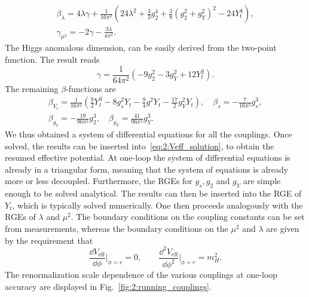 \begin{equation}
\begin{gathered}
\beta_\lambda = 4 \lambda \gamma + \frac{1}{16 \pi^2} (24 \lambda^2 + \frac{3}{2} g_2^4 + \frac{3}{8} (g_2^2 + g_Y^2)^2 - 24 Y_t^4), \\
\gamma_{\mu^2} = - 2 \gamma - \frac{3 \lambda}{4 \pi^2}.
\end{gathered}
\label{eq:2:beta_lambda_and_gamma_mu2}
\end{equation}
The Higgs anomalous dimension, can be easily derived from the two-point function. The result reads
\begin{equation}
\gamma = \frac{1}{64 \pi^2} \left( -9 g_2^2 - 3 g_Y^2 + 12 Y_t^2 \right).
\end{equation}
The remaining $\beta$-functions are
\begin{equation}
\begin{gathered}
\beta_{Y_t} = \frac{1}{16 \pi^2} \left(\frac{9}{2} Y_t^3 - 8 g_s^2 Y_t - \frac{9}{4} g^2 Y_t - \frac{17}{2} g_Y^2 Y_t \right), \quad \beta_s = - \frac{7}{16 \pi^2} g_s^3, \\
\beta_{g_2} = - \frac{19}{96 \pi^2} g_2^3, \quad \beta_{g_Y} = \frac{41}{96 \pi^2} g_Y^3.
\end{gathered}
\end{equation}
We thus obtained a system of differential equations for all the couplings. Once solved, the results can be inserted into~\eqref{eq:2:Veff_solution}, to obtain the resumed effective potential. At one-loop the system of differential equations is already in a triangular form, meaning that the system of equations is already more or less decoupled. Furthermore, the \acs{RGE}s for $g_s, g_2$ and $g_Y$ are simple enough to be solved analytical. The results can then be inserted into the \acs{RGE} of $Y_t$, which is typically solved numerically. One then proceeds analogously with the \acs{RGE}s of $\lambda$ and $\mu^2$. The boundary conditions on the coupling constants can be set from measurements, whereas the boundary conditions on the $\mu^2$ and $\lambda$ are given by the requirement that
\begin{equation}
\frac{\dd V_{\text{eff}}}{\dd \phi}\bigg \vert_{\phi = v} = 0, \qquad \frac{\dd^2 V_\text{eff}}{\dd \phi^2} \bigg \vert_{\phi = v} = m_H^2.
\end{equation}
The renormalization scale dependence of the various couplings at one-loop accuracy are displayed in Fig.~\ref{fig:2:running_couplings}.

